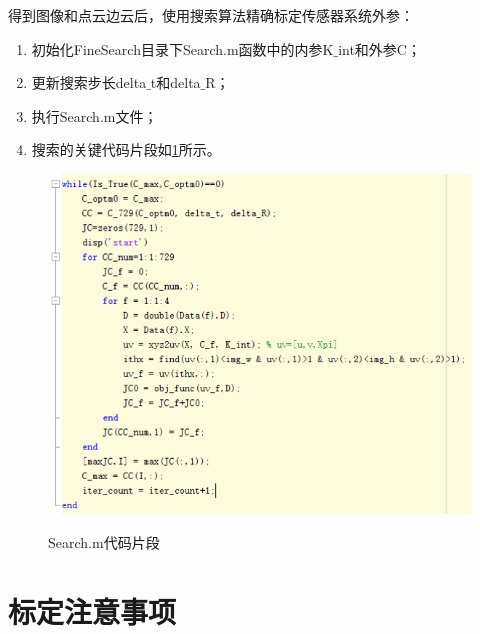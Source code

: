 得到图像和点云边云后，使用搜索算法精确标定传感器系统外参：

\begin{enumerate}[$\star$]
\item 初始化FineSearch目录下Search.m函数中的内参K$\_$int和外参C；
\item 更新搜索步长delta$\_$t和delta$\_$R；
\item 执行Search.m文件；
\item 搜索的关键代码片段如\figurename\ref{fig: pic11}所示。
\end{enumerate}

\begin{figure}[htbp]
    \centering
    \includegraphics[width=13cm]{pic/11.png} \\
    \caption{Search.m代码片段}\label{fig: pic11}
\end{figure}

\section{标定注意事项}

